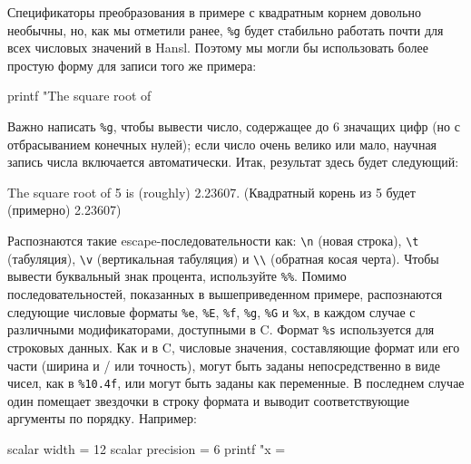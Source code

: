 Спецификаторы преобразования в примере с квадратным корнем довольно
необычны, но, как мы отметили ранее, \texttt{\%g} будет стабильно
работать почти для всех числовых значений в Hansl. Поэтому мы могли бы
использовать более простую форму для записи того же примера:
\begin{code}
printf "The square root of %
\end{code}
Важно написать \texttt{\%g}, чтобы вывести число, содержащее до 6
значащих цифр (но с отбрасыванием конечных нулей); если число очень
велико или мало, научная запись числа включается автоматически. Итак,
результат здесь будет следующий:
\begin{code}
The square root of 5 is (roughly) 2.23607.
(Квадратный корень из 5 будет (примерно) 2.23607)
\end{code}
Распознаются такие escape-последовательности как: \verb|\n| (новая
строка), \verb|\t| (табуляция), \verb|\v| (вертикальная табуляция) и
\verb|\\| (обратная косая черта). Чтобы вывести буквальный знак
процента, используйте \verb|%%|.
Помимо последовательностей, показанных в вышеприведенном примере,
распознаются следующие числовые форматы \verb|%e|, \verb|%E|,
\verb|%f|, \verb|%g|, \verb|%G| и
\verb|%x|, в каждом случае с различными модификаторами, доступными в
C. Формат \verb|%s| используется для строковых данных. Как и в C,
числовые значения, составляющие формат или его части (ширина и / или
точность), могут быть заданы непосредственно в виде чисел, как в
\verb|%10.4f|, или могут быть заданы как переменные. В последнем
случае один помещает звездочки в строку формата и выводит
соответствующие аргументы по порядку. Например:
\begin{code}
  scalar width = 12 
  scalar precision = 6 
  printf "x = %
\end{code}

